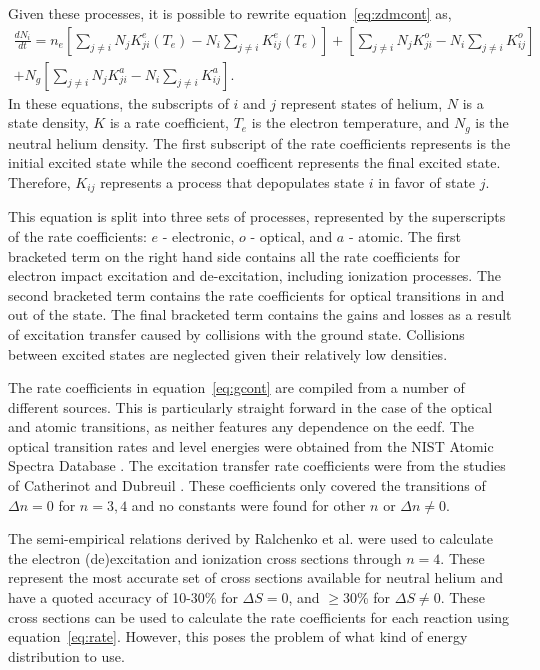 Given these processes, it is possible to rewrite equation~\ref{eq:zdmcont} as,
\begin{multline}
  \frac{dN_i}{dt} =   n_e \left[       \sum_{j\neq i} N_j K^e_{ji}(T_e) 
                                 - N_i \sum_{j\neq i}     K^e_{ij}(T_e) \right]
                        + \left[       \sum_{j\neq i} N_j K^o_{ji} 
                                 - N_i \sum_{j\neq i}     K^o_{ij}      \right] \\
                    + N_g \left[       \sum_{j\neq i} N_j K^a_{ji} 
                                 - N_i \sum_{j\neq i}     K^a_{ij}      \right].
  \label{eq:gcont}
\end{multline}
In these equations, the subscripts of $i$ and $j$ represent states of helium,
$N$ is a state density, $K$ is a rate coefficient, $T_e$ is the electron
temperature, and $N_g$ is the neutral helium density. The first subscript of the
rate coefficients represents is the initial excited state while the second
coefficent represents the final excited state. Therefore, $K_{ij}$ represents a
process that depopulates state $i$ in favor of state $j$.

This equation is split into three sets of processes, represented by the
superscripts of the rate coefficients: $e$ - electronic, $o$ - optical, and $a$
- atomic. The first bracketed term on the right hand side contains all the rate
coefficients for electron impact excitation and de-excitation, including
ionization processes. The second bracketed term contains the rate coefficients
for optical transitions in and out of the state. The final bracketed term
contains the gains and losses as a result of excitation transfer caused by
collisions with the ground state. Collisions between excited states are
neglected given their relatively low densities.

The rate coefficients in equation~\ref{eq:gcont} are compiled from a number of
different sources. This is particularly straight forward in the case of the
optical and atomic transitions, as neither features any dependence on the
\acs{eedf}. The optical transition rates and level energies were obtained from
the NIST Atomic Spectra Database \cite{Kramida2012}. The excitation transfer
rate coefficients were from the studies of Catherinot and Dubreuil
\cite{Catherinot1981, Dubreuil1980}. These coefficients only covered the
transitions of $\Delta n=0$ for $n=3,4$ and no constants were found for other
$n$ or $\Delta n\neq 0$.

The semi-empirical relations derived by Ralchenko et al. \cite{Ralchenko2008}
were used to calculate the electron (de)excitation and ionization cross sections
through $n=4$. These represent the most accurate set of cross sections available
for neutral helium and have a quoted accuracy of 10-30\% for $\Delta S=0$, and
$\ge30$\% for $\Delta S \neq 0$. These cross sections can be used to calculate
the rate coefficients for each reaction using equation~\ref{eq:rate}. However,
this poses the problem of what kind of energy distribution to use.

